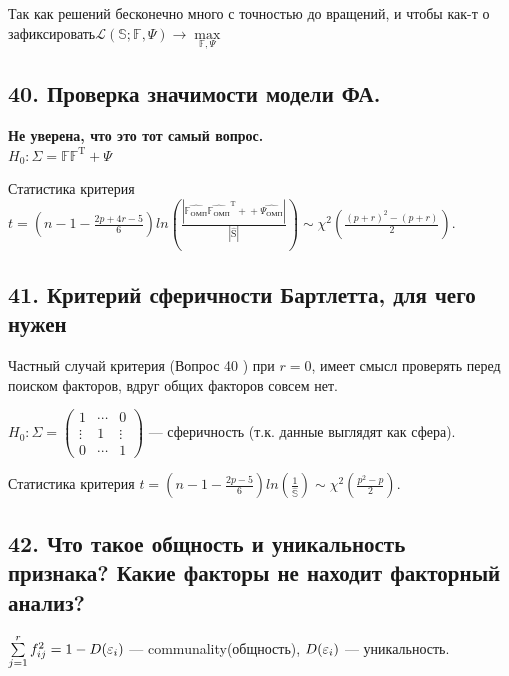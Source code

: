 Так как решений бесконечно много с точностью до вращений, и чтобы как-т о зафиксировать$\mathcal{L}(\mathbb{S};\mathbb{F}, \Psi) \rightarrow \max\limits_{\mathbb{F},\Psi}$
\subsection*{ 40.  Проверка значимости модели ФА.}

{\bf{Не уверена, что это тот самый вопрос.}} \\
$H_{0}: \Sigma = \mathbb{FF^\mathrm{T}} + \Psi$ 

Статистика критерия $t = \left(n-1 - \frac{2p+4r-5}{6}\right)ln\left(\frac{|\mathbb{\hat{F_{ОМП}}\hat{F_{ОМП}}^\mathrm{T}+}+\hat{\Psi_{ОМП}}|}{|\mathrm{\hat{S}}|}\right) \sim \chi^2\left(\frac{(p+r)^2 - (p+r)}{2}\right)$.


\subsection*{ 41.  Критерий сферичности Бартлетта, для чего нужен}


Частный случай критерия (Вопрос 40 ) при $r = 0$, имеет смысл проверять перед поиском факторов, вдруг общих факторов совсем нет.

$H_0: \Sigma =  \left(\begin{matrix}
1&\cdots& 0 \\
\vdots&1& \vdots \\
0&\cdots& 1
\end{matrix}\right)$ --- сферичность (т.к. данные выглядят как сфера).

Статистика критерия $t = \left(n-1 - \frac{2p-5}{6}\right)ln\left(\frac{1}{\mathbb{\hat{S}}}\right) \sim \chi^2\left(\frac{p^2 - p}{2}\right)$.

\subsection*{ 42. Что такое общность и уникальность признака? Какие факторы не находит факторный анализ?}

$\sum\limits_{j = 1}^r{f_{ij}^2 = 1 - D(\varepsilon_i)}$ --- communality(общность),  $D(\varepsilon_i)$ --- уникальность.


